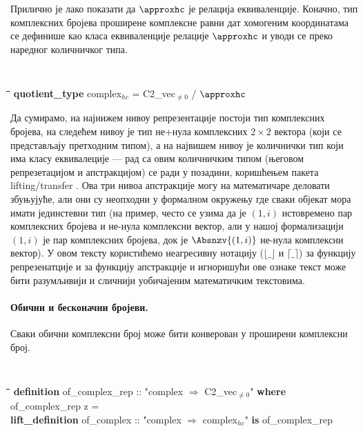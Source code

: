 \noindent Прилично је лако показати да $\approxhc$ је релација
еквиваленције. Коначно, тип комплексних бројева проширене комплексне
равни дат хомогеним координатама се дефинише као класа еквиваленције
релације $\approxhc$ и уводи се преко наредног количничког типа.

{\tt
\begin{tabbing}
\hspace{5mm}\=\hspace{5mm}\=\hspace{5mm}\=\hspace{5mm}\=\hspace{5mm}\=\kill
{\bf quotient\_type} complex$_{hc}$ = C2\_vec$_{\neq 0}$ / $\approxhc$
\end{tabbing}
}

Да сумирамо, на најнижем нивоу репрезентације постоји тип комплексних
бројева, на следећем нивоу је тип не+нула комплексних $2\times 2$
вектора (који се представљају претходним типом), а на највишем нивоу
је количнички тип који има класу еквивалеције --- рад са овим
количничким типом (његовом репрезетацијом и апстракцијом) се ради у
позадини, коришћењем пакета lifting/transfer \cite{lifting-transfer}.
Ова три нивоа апстракције могу на математичаре деловати збуњујуће, али
они су неопходни у формалном окружењу где сваки објекат мора имати
јединстевни тип (на пример, често се узима да је $(1, i)$ истовремено
пар комплексних бројева и не-нула комплексни вектор, али у нашој
формализацији $(1, i)$ је пар комплексних бројева, док је $\Absnzv{(1,
  i)}$ не-нула комплексни вектор). У овом тексту користићемо
неагресивну нотацију ($\lfloor\_\rfloor$ и $\lceil\_\rceil$) за
функцију репрезенатције и за функцију апстракције и игноришући ове
ознаке текст може бити разумљивији и сличнији уобичајеним математичким
текстовима.

\paragraph{Обични и бесконачни бројеви.}
Сваки обични комплексни број може бити конверован у проширени
комплексни број.

{\tt
\begin{tabbing}
\hspace{5mm}\=\hspace{5mm}\=\hspace{5mm}\=\hspace{5mm}\=\hspace{5mm}\=\kill
{\bf definition} of\_complex\_rep :: "complex $\Rightarrow$ C2\_vec$_{\neq 0}$" \textbf{where}\\
\>of\_complex\_rep z = \\
{\bf lift\_definition} of\_complex :: "complex $\Rightarrow$ complex$_{hc}$" \textbf{is} of\_complex\_rep
\end{tabbing}
}

